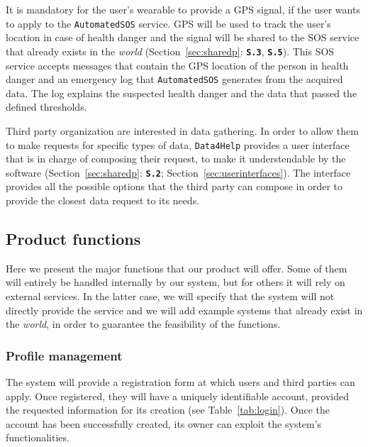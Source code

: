 \documentclass[12pt]{article}
\begin{document}
    It is mandatory for the user's wearable to provide a GPS signal, if the user wants to apply to the \texttt{AutomatedSOS} service. GPS will be used to track the user's location in case of health danger and the signal will be shared to the SOS service that already exists in the \textit{world} (Section~\ref{sec:sharedp}: \textbf{\texttt{S.3}}, \textbf{\texttt{S.5}}). This SOS service accepts messages that contain the GPS location of the person in health danger and an emergency log that \texttt{AutomatedSOS} generates from the acquired data. The log explains the suspected health danger and the data that passed the defined thresholds.

    Third party organization are interested in data gathering. In order to allow them to make requests for specific types of data, \texttt{Data4Help} provides a user interface that is in charge of composing their request, to make it understendable by the software (Section~\ref{sec:sharedp}: \textbf{\texttt{S.2}}; Section~\ref{sec:userinterfaces}). The interface provides all the possible options that the third party can compose in order to provide the closest data request to its needs.

  \subsection{Product functions}

    Here we present the major functions that our product will offer. Some of them will entirely be handled internally by our system, but for others it will rely on external services. In the latter case, we will specify that the system will not directly provide the service and we will add example systems that already exist in the \textit{world}, in order to guarantee the feasibility of the functions.

    \subsubsection{Profile management}

      The system will provide a registration form at which users and third parties can apply. Once registered, they will have a uniquely identifiable account, provided the requested information for its creation (see Table~\ref{tab:login}). Once the account has been successfully created, its owner can exploit the system's functionalities.
\end{document}
